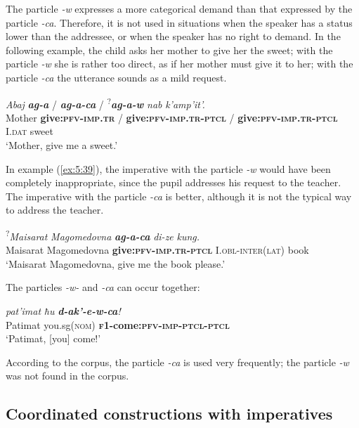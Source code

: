 ﻿\documentclass[output=paper]{langsci/langscibook}
\begin{document}
The particle \emph{-w} expresses a more categorical demand than that
expressed by the particle \emph{-ca}. Therefore, it is not used in situations when the speaker has a status lower than the addressee, or
when the speaker has no right to demand. In the following example, the
child asks her mother to give her the sweet; with the particle \emph{-w}
she is rather too direct, as if her mother must give it to her; with the
particle \emph{-ca} the utterance sounds as a mild request.

\ea %
\gll \emph{Abaj} \emph{\textbf{ag-a}} / \emph{\textbf{ag-a-ca}}  / \textsuperscript{?}\emph{\textbf{ag-a-w}} \emph{nab} \emph{k'amp'it'.}\\
Mother \textbf{give:\textsc{pfv}-\textsc{imp}.\textsc{tr}} / \textbf{give:\textsc{pfv}-\textsc{imp}.\textsc{tr}-\textsc{ptcl}} / \textbf{give:\textsc{pfv}-\textsc{imp}.\textsc{tr}-\textsc{ptcl}} I.\textsc{dat} sweet\\
\glt `Mother, give me a sweet.'
\z

In example (\ref{ex:5:39}), the imperative with the particle \emph{-w} would have
been completely inappropriate, since the pupil addresses his request to
the teacher. The imperative with the particle \emph{-ca} is better,
although it is not the typical way to address the teacher.

\ea \label{ex:5:39} %
\gll \textsuperscript{?}\emph{Maisarat} \emph{Magomedovna} \emph{\textbf{ag-a-ca}} \emph{di-ze} \emph{kung.}\\
 Maisarat Magomedovna \textbf{give:\textsc{pfv}-\textsc{imp}.\textsc{tr}-\textsc{ptcl}} I.\textsc{obl}-\textsc{inter}(\textsc{lat})  book\\
\glt `Maisarat Magomedovna, give me the book please.'
\z

The particles \emph{-w-} and \emph{-ca} can occur together:

\ea %
\gll \emph{pat'imat} \emph{ħu} \emph{\textbf{d-ak'-e-w-ca}!}\\
 Patimat you.sg(\textsc{nom}) \textbf{\textsc{f1}-come:\textsc{pfv}-\textsc{imp}-\textsc{ptcl}-\textsc{ptcl}}\\
\glt `Patimat, [you] come!'
\z

According to the corpus, the particle \emph{-ca} is used very
frequently; the particle \emph{-w} was not found in the corpus.

\removelastskip
{}

\subsection{Coordinated constructions with imperatives}
\end{document}

